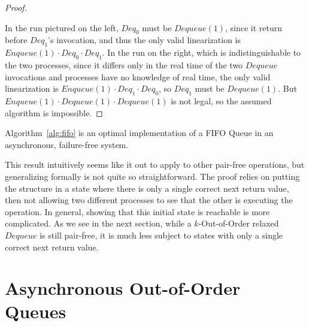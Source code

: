 \documentclass[a4paper,anonymous,USenglish]{lipics-v2021} %
\theoremstyle{definition}
\begin{document}
\begin{proof}
\begin{center}
  \end{center}
  In the run pictured on the left, $Deq_0$ must be $Dequeue(1)$, since it return before $Deq_1$'s invocation, and thus the only valid linearization is $Enqueue(1) \cdot Deq_0 \cdot Deq_1$.  In the run on the right, which is indistinguishable to the two processes, since it differs only in the real time of the two $Dequeue$ invocations and processes have no knowledge of real time, the only valid linearization is $Enqueue(1) \cdot Deq_1 \cdot Deq_0$, so $Deq_1$ must be $Dequeue(1)$.  But $Enqueue(1) \cdot Dequeue(1) \cdot Dequeue(1)$ is not legal, so the assumed algorithm is impossible.  
\end{proof}

\begin{theorem}
  Algorithm~\ref{alg:fifo} is an optimal implementation of a FIFO Queue in an asynchronous, failure-free system.
\end{theorem}

This result intuitively seems like it out to apply to other pair-free operations, but generalizing formally is not quite so straightforward.  The proof relies on putting the structure in a state where there is only a single correct next return value, then not allowing two different processes to see that the other is executing the operation.  In general, showing that this initial state is reachable is more complicated.  As we see in the next section, while a $k$-Out-of-Order relaxed $Dequeue$ is still pair-free, it is much less subject to states with only a single correct next return value.   

  
\section{Asynchronous Out-of-Order Queues}
\end{document}
